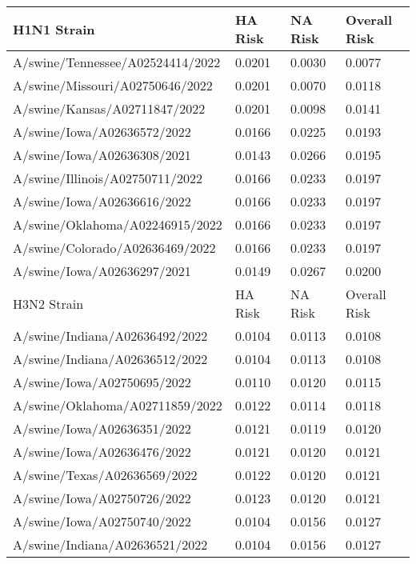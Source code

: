 \begin{tabular}{L{2.1in}|L{0.7in}|L{0.7in}|L{0.7in}}\hline
 H1N1 Strain & HA Risk & NA Risk & Overall Risk \\\hline
 A/swine/Tennessee/A02524414/2022 &0.0201&0.0030&0.0077\\\hline
 A/swine/Missouri/A02750646/2022 &0.0201&0.0070&0.0118\\\hline
 A/swine/Kansas/A02711847/2022 &0.0201&0.0098&0.0141\\\hline
 A/swine/Iowa/A02636572/2022 &0.0166&0.0225&0.0193\\\hline
 A/swine/Iowa/A02636308/2021 &0.0143&0.0266&0.0195\\\hline
 A/swine/Illinois/A02750711/2022 &0.0166&0.0233&0.0197\\\hline
 A/swine/Iowa/A02636616/2022 &0.0166&0.0233&0.0197\\\hline
 A/swine/Oklahoma/A02246915/2022 &0.0166&0.0233&0.0197\\\hline
 A/swine/Colorado/A02636469/2022 &0.0166&0.0233&0.0197\\\hline
 A/swine/Iowa/A02636297/2021 &0.0149&0.0267&0.0200\\\hline
 H3N2 Strain & HA Risk & NA Risk & Overall Risk \\\hline
 A/swine/Indiana/A02636492/2022 &0.0104&0.0113&0.0108\\\hline
 A/swine/Indiana/A02636512/2022 &0.0104&0.0113&0.0108\\\hline
 A/swine/Iowa/A02750695/2022 &0.0110&0.0120&0.0115\\\hline
 A/swine/Oklahoma/A02711859/2022 &0.0122&0.0114&0.0118\\\hline
 A/swine/Iowa/A02636351/2022 &0.0121&0.0119&0.0120\\\hline
 A/swine/Iowa/A02636476/2022 &0.0121&0.0120&0.0121\\\hline
 A/swine/Texas/A02636569/2022 &0.0122&0.0120&0.0121\\\hline
 A/swine/Iowa/A02750726/2022 &0.0123&0.0120&0.0121\\\hline
 A/swine/Iowa/A02750740/2022 &0.0104&0.0156&0.0127\\\hline
 A/swine/Indiana/A02636521/2022 &0.0104&0.0156&0.0127\\\hline
 \end{tabular}